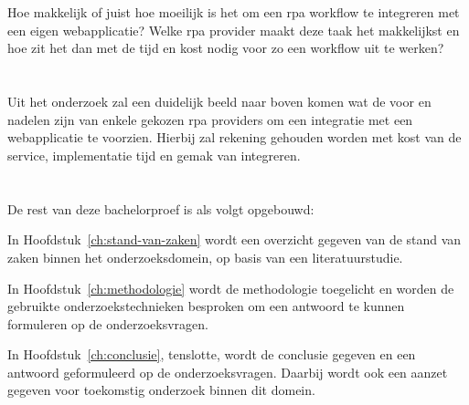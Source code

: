 \section{}
\label{sec:onderzoeksvraag}
Hoe makkelijk of juist hoe moeilijk is het om een \acrshort{rpa} workflow te integreren met een eigen webapplicatie? Welke \acrshort{rpa} provider maakt deze taak het makkelijkst en hoe zit het dan met de tijd en kost nodig voor zo een workflow uit te werken?


\section{}
\label{sec:onderzoeksdoelstelling}
Uit het onderzoek zal een duidelijk beeld naar boven komen wat de voor en nadelen zijn van enkele gekozen \acrshort{rpa} providers om een integratie met een webapplicatie te voorzien. Hierbij zal rekening gehouden worden met kost van de service, implementatie tijd en gemak van integreren.

\section{}
\label{sec:opzet-bachelorproef}
De rest van deze bachelorproef is als volgt opgebouwd:

In Hoofdstuk~\ref{ch:stand-van-zaken} wordt een overzicht gegeven van de stand van zaken binnen het onderzoeksdomein, op basis van een literatuurstudie.

In Hoofdstuk~\ref{ch:methodologie} wordt de methodologie toegelicht en worden de gebruikte onderzoekstechnieken besproken om een antwoord te kunnen formuleren op de onderzoeksvragen.

In Hoofdstuk~\ref{ch:conclusie}, tenslotte, wordt de conclusie gegeven en een antwoord geformuleerd op de onderzoeksvragen. Daarbij wordt ook een aanzet gegeven voor toekomstig onderzoek binnen dit domein.